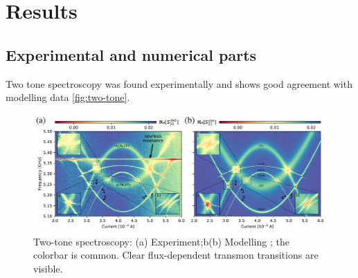 \documentclass[%
 aip,
 amsmath,amssymb,
 reprint,%
]{revtex4-1}
\begin{document}
\section{Results}

\subsection{\label{sec:level1} Experimental and numerical parts}

Two tone spectroscopy was found experimentally and shows good agreement with modelling data \autoref{fig:two-tone}. 

\begin{figure}

	\centering
	\includegraphics[width=\linewidth]{main_picture}
	\caption{Two-tone spectroscopy: (a) Experiment;b(b) Modelling ; the colorbar is common.  Clear flux-dependent transmon transitions are visible.}
	\label{fig:two-tone}
\end{figure}
\end{document}
